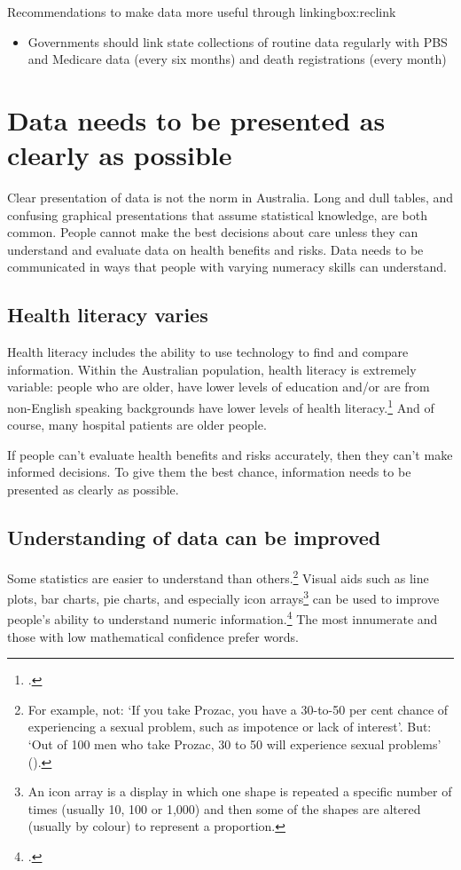 \documentclass[FrontPage]{grattan}
\begin{document}
\begin{addsmallbox}[H]{Recommendations to make data more useful through linking}{box:reclink}
\begin{itemize}[leftmargin=*]
    \item Governments should link state collections of routine data regularly with PBS and Medicare data (every six months) and death registrations (every month)
\end{itemize}
\end{addsmallbox}

\chapter{Data needs to be presented as clearly as possible}\label{chap:presentation}
Clear presentation of data is not the norm in Australia. Long and dull tables, and confusing graphical presentations that assume statistical knowledge, are both common. People cannot make the best decisions about care unless they can understand and evaluate data on health benefits and risks. Data needs to be communicated in ways that people with varying numeracy skills can understand.  

\section{Health literacy varies}
Health literacy includes the ability to use technology to find and compare information. Within the Australian population, health literacy is extremely variable: people who are older, have lower levels of education and/or are from non-English speaking backgrounds have lower levels of health literacy.\footcite{ABS-adultcompetency-2012}
And of course, many hospital patients are older people. 

If people can’t evaluate health benefits and risks accurately, then they can’t make informed decisions. To give them the best chance, information needs to be presented as clearly as possible.

\section{Understanding of data can be improved}
Some statistics are easier to understand than others.\footnote{For example, not: ‘If you take Prozac, you have a 30-to-50 per cent chance of experiencing a sexual problem, such as impotence or lack of interest’. But: ‘Out of 100 men who take Prozac, 30 to 50 will experience sexual problems’ (\textcites{RN88}{RN84}).}
Visual aids such as line plots, bar charts, pie charts, and especially icon arrays\footnote{An icon array is a display in which one shape is repeated a specific number of times (usually 10, 100 or 1,000) and then some of the shapes are altered (usually by colour) to represent a proportion.}
can be used to improve people’s ability to understand numeric information.\footcite{RN91}
The most innumerate and those with low mathematical confidence prefer words.
\end{document}
